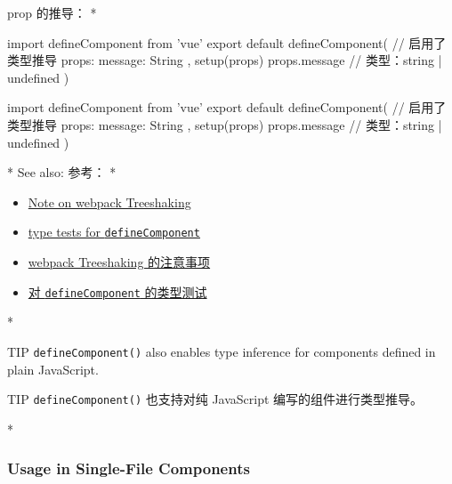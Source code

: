 \begin{paracol}{2}
prop 的推导：
\switchcolumn[0]*%
\begin{codeJs}
import { defineComponent } from 'vue'
export default defineComponent({
  // 启用了类型推导
  props: {
    message: String
  },
  setup(props) {
    props.message // 类型：string | undefined
  }
})
\end{codeJs}
\switchcolumn
\begin{codeJs}
import { defineComponent } from 'vue'
export default defineComponent({
  // 启用了类型推导
  props: {
    message: String
  },
  setup(props) {
    props.message // 类型：string | undefined
  }
})
\end{codeJs}
\switchcolumn[0]*%
See also:
\switchcolumn
参考：
\switchcolumn[0]*%
\begin{itemize}
\item
  \href{https://vuejs.org/api/general.html\#note-on-webpack-treeshaking}{Note
  on webpack Treeshaking}
\item
  \href{https://github.com/vuejs/core/blob/main/packages/dts-test/defineComponent.test-d.tsx}{type
  tests for \texttt{defineComponent}}
\end{itemize}
\switchcolumn
\begin{itemize}
\item
  \href{https://cn.vuejs.org/api/general.html\#note-on-webpack-treeshaking}{webpack
  Treeshaking 的注意事项}
\item
  \href{https://github.com/vuejs/core/blob/main/packages/dts-test/defineComponent.test-d.tsx}{对
  \texttt{defineComponent} 的类型测试}
\end{itemize}
\switchcolumn[0]*%
\begin{vueQuote}{TIP}
\texttt{defineComponent()} also enables type inference for components
defined in plain JavaScript.
\end{vueQuote} 
\switchcolumn
\begin{vueQuote}{TIP}
\texttt{defineComponent()} 也支持对纯 JavaScript
编写的组件进行类型推导。
\end{vueQuote} 
\switchcolumn[0]*%
\subsubsection{Usage in Single-File Components}
\switchcolumn

\end{paracol}
